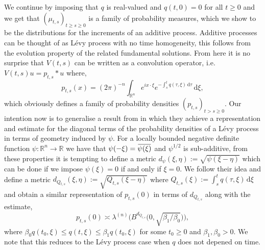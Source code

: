 \documentclass[a4paper, 12pt]{report}
\theoremstyle{cor}
\theoremstyle{remark}
\theoremstyle{definition}
\newcommand{\overbar}[1]{\mkern 1.5mu\overline{\mkern-1.5mu#1\mkern-1.5mu}\mkern 1.5mu}
\begin{document}
We continue by imposing that $q$ is real-valued and $q(t, 0) = 0$ for all $t \ge 0$ and we get that $(\mu_{t, s})_{t \ge s \ge 0}$ is a family of probability measures, which we show to be the distributions for the increments of an additive process.  Additive processes can be thought of as L\'evy process with no time homogeneity, this follows from the evolution property of the related fundamental solutions.  From here it is no surprise that $V(t, s)$ can be written as a convolution operator, i.e. $V(t, s)u = p_{t, s} \ast u$ where,
$$
p_{t, s}(x) = (2\pi)^{-n}\int_{\mathbb{R}^n}e^{ix\cdot\xi}e^{-\int_s^tq(\tau, \xi)\,\mathrm{d}\tau}\,\mathrm{d}\xi,
$$
which obviously defines a family of probability densities $(p_{t, s})_{t > s \ge 0}$.  Our intention now is to generalise a result from \cite{Paper} in which they achieve a representation and estimate for the diagonal terms of the probability densities of a L\'evy process in terms of geometry induced by $\psi$.  For a locally bounded negative definite function $\psi : \mathbb{R}^n \to \mathbb{R}$ we have that $\psi(-\xi) = \overbar{\psi(\xi)}$ and $\psi^{1/2}$ is sub-additive, from these properties it is tempting to define a metric $d_\psi(\xi, \eta) := \sqrt{\psi(\xi - \eta)}$ which can be done if we impose $\psi(\xi) = 0$ if and only if $\xi = 0$.  We follow their idea and define a metric $d_{Q_{t, s}}(\xi, \eta) := \sqrt{Q_{t, s}(\xi - \eta)}$ where $Q_{t, s}(\xi) := \int_s^tq(\tau, \xi)\,\mathrm{d}\xi$ and obtain a similar representation of $p_{t, s}(0)$ in terms of $d_{Q_{t, s}}$ along with the estimate,
$$
p_{t, s}(0) \asymp \lambda^{(n)}\Big(B^{d_{Q_{t, s}}}\big(0, \sqrt{\beta_1/\beta_0}\big)\Big),
$$
where $\beta_0q(t_0, \xi) \le q(t, \xi) \le \beta_1q(t_0, \xi)$ for some $t_0 \ge 0$ and $\beta_1, \beta_0 > 0$.  We note that this reduces to the L\'evy process case when $q$ does not depened on time.
\end{document}
